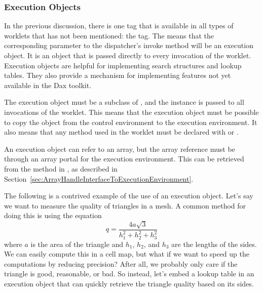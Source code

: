 

\subsubsection{Execution Objects}


In the previous discussion, there is one \controlsignature tag that is
available in all types of worklets that has not been mentioned: the
 tag. The  means that the
corresponding parameter to the dispatcher's invoke method will be an
execution object. It is an object that is passed directly to every
invocation of the worklet. Execution objects are helpful for implementing
search structures and lookup tables. They also provide a mechanism for
implementing features not yet available in the Dax toolkit.

The execution object must be a subclass of ,
and the instance is passed to all invocations of the worklet. This means
that the execution object must be possible to copy the object from the
control environment to the execution environment. It also means that any
method used in the worklet must be declared with
 or .

An execution object can refer to an array, but the array reference must be
through an array portal for the execution environment. This can be
retrieved from the  method in
, as described in
Section~\ref{sec:ArrayHandleInterfaceToExecutionEnvironment}.

The following is a contrived example of the use of an execution
object. Let's say we want to measure the quality of triangles in a mesh. A
common method for doing this is using the equation
\begin{equation*}
  q = \frac{4a\sqrt{3}}{h_1^2 + h_2^2 + h_3^2}
\end{equation*}
where $a$ is the area of the triangle and $h_1$, $h_2$, and $h_3$ are the
lengths of the sides. We can easily compute this in a cell map, but what if
we want to speed up the computations by reducing precision? After all, we
probably only care if the triangle is good, reasonable, or bad. So instead,
let's embed a lookup table in an execution object that can quickly retrieve
the triangle quality based on its sides.

